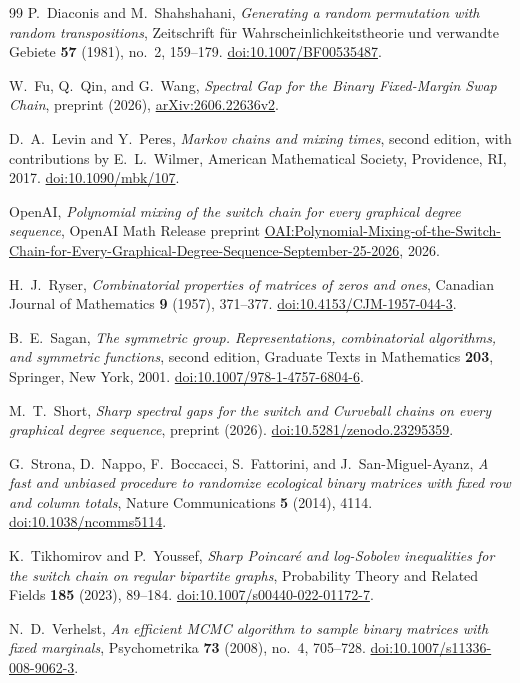 \begin{thebibliography}{99}
P.~Diaconis and M.~Shahshahani,
\emph{Generating a random permutation with random transpositions},
Zeitschrift f\"ur Wahrscheinlichkeitstheorie und verwandte Gebiete
\textbf{57} (1981), no.~2, 159--179.
\href{https://doi.org/10.1007/BF00535487}{doi:10.1007/BF00535487}.

W.~Fu, Q.~Qin, and G.~Wang,
\emph{Spectral Gap for the Binary Fixed-Margin Swap Chain},
preprint (2026), \href{https://arxiv.org/abs/2606.22636v2}{arXiv:2606.22636v2}.

D.~A.~Levin and Y.~Peres,
\emph{Markov chains and mixing times}, second edition,
with contributions by E.~L.~Wilmer,
American Mathematical Society, Providence, RI, 2017.
\href{https://doi.org/10.1090/mbk/107}{doi:10.1090/mbk/107}.

OpenAI,
\emph{Polynomial mixing of the switch chain for every graphical degree sequence},
OpenAI Math Release preprint
\href{https://github.com/openai/math/tree/adc7f1241b42e322a6451854ab7e4b4c146bf78a/preprints/Polynomial-Mixing-of-the-Switch-Chain-for-Every-Graphical-Degree-Sequence-September-25-2026/build}{OAI:Polynomial-Mixing-of-the-Switch-Chain-for-Every-Graphical-Degree-Sequence-September-25-2026},
2026.

H.~J.~Ryser,
\emph{Combinatorial properties of matrices of zeros and ones},
Canadian Journal of Mathematics \textbf{9} (1957), 371--377.
\href{https://doi.org/10.4153/CJM-1957-044-3}{doi:10.4153/CJM-1957-044-3}.

B.~E.~Sagan,
\emph{The symmetric group. Representations, combinatorial algorithms, and
symmetric functions}, second edition,
Graduate Texts in Mathematics \textbf{203}, Springer, New York, 2001.
\href{https://doi.org/10.1007/978-1-4757-6804-6}{doi:10.1007/978-1-4757-6804-6}.

M.~T.~Short,
\emph{Sharp spectral gaps for the switch and Curveball chains on every
graphical degree sequence},
preprint (2026).
\href{https://doi.org/10.5281/zenodo.23295359}{doi:10.5281/zenodo.23295359}.

G.~Strona, D.~Nappo, F.~Boccacci, S.~Fattorini, and J.~San-Miguel-Ayanz,
\emph{A fast and unbiased procedure to randomize ecological binary matrices
with fixed row and column totals},
Nature Communications \textbf{5} (2014), 4114.
\href{https://doi.org/10.1038/ncomms5114}{doi:10.1038/ncomms5114}.

K.~Tikhomirov and P.~Youssef,
\emph{Sharp Poincar\'e and log-Sobolev inequalities for the switch chain on
regular bipartite graphs},
Probability Theory and Related Fields \textbf{185} (2023), 89--184.
\href{https://doi.org/10.1007/s00440-022-01172-7}{doi:10.1007/s00440-022-01172-7}.

N.~D.~Verhelst,
\emph{An efficient MCMC algorithm to sample binary matrices with fixed marginals},
Psychometrika \textbf{73} (2008), no.~4, 705--728.
\href{https://doi.org/10.1007/s11336-008-9062-3}{doi:10.1007/s11336-008-9062-3}.

\end{thebibliography}
